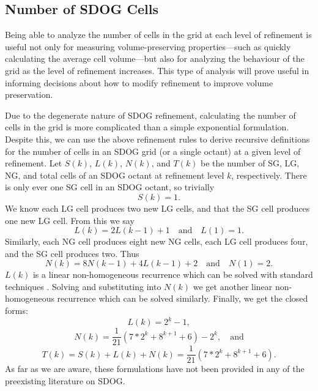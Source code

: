 \subsection{Number of SDOG Cells} \label{chap:4:numCells}
Being able to analyze the number of cells in the grid at each level of refinement is useful not only for measuring volume-preserving properties---such as quickly calculating the average cell volume---but also for analyzing the behaviour of the grid as the level of refinement increases.
This type of analysis will prove useful in informing decisions about how to modify refinement to improve volume preservation.


Due to the degenerate nature of SDOG refinement, calculating the number of cells in the grid is more complicated than a simple exponential formulation.
Despite this, we can use the above refinement rules to derive recursive definitions for the number of cells in an SDOG grid (or a single octant) at a given level of refinement.
Let $S(k)$, $L(k)$, $N(k)$, and $T(k)$ be the number of SG, LG, NG, and total cells of an SDOG octant at refinement level $k$, respectively.
There is only ever one SG cell in an SDOG octant, so trivially
%
\begin{equation*}
S(k) = 1.
\end{equation*}
%
We know each LG cell produces two new LG cells, and that the SG cell produces one new LG cell.
From this we say
%
\begin{equation*}
L(k) = 2L(k-1) + 1 \quad\text{and}\quad L(1) = 1.
\end{equation*}
%
Similarly, each NG cell produces eight new NG cells, each LG cell produces four, and the SG cell produces two.
Thus
%
\begin{equation*}
N(k) = 8N(k-1) + 4L(k-1) + 2 \quad\text{and}\quad N(1) = 2.
\end{equation*}
%
$L(k)$ is a linear non-homogeneous recurrence which can be solved with standard techniques \cite{bellman1963differential}.
Solving and substituting into $N(k)$ we get another linear non-homogeneous recurrence which can be solved similarly.
Finally, we get the closed forms:
%
\begin{equation*}
L(k) = 2^{k} - 1,
\end{equation*}
%
\begin{equation*}
N(k) = \frac{1}{21} \left( 7*2^{k} + 8^{k+1} + 6 \right) - 2^{k}, \quad\text{and}
\end{equation*}
%
\begin{equation*}
T(k) = S(k) + L(k) + N(k) = \frac{1}{21} \left( 7*2^{k} + 8^{k+1} + 6 \right).
\end{equation*}
%
As far as we are aware, these formulations have not been provided in any of the preexisting literature on SDOG.


